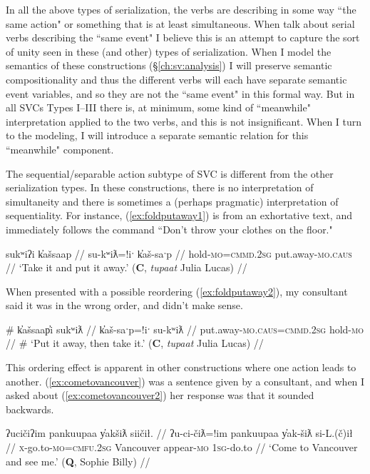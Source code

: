 In all the above types of serialization, the verbs are describing in some way ``the same action" or something that is at least simultaneous. When \citet{aikhenvalddixon2006} talk about serial verbs describing the ``same event" I believe this is an attempt to capture the sort of unity seen in these (and other) types of serialization. When I model the semantics of these constructions (\S\ref{ch:sv:analysis}) I will preserve semantic compositionality and thus the different verbs will each have separate semantic event variables, and so they are not the ``same event" in this formal way. But in all SVCs Types I--III there is, at minimum, some kind of ``meanwhile" interpretation applied to the two verbs, and this is not insignificant. When I turn to the modeling, I will introduce a separate semantic relation for this ``meanwhile" component.

The sequential/separable action subtype of SVC is different from the other serialization types. In these constructions, there is no interpretation of simultaneity and there is sometimes a (perhaps pragmatic) interpretation of sequentiality. For instance, (\ref{ex:foldputaway1}) is from an exhortative text, and immediately follows the command ``Don't throw your clothes on the floor."

\ex \label{ex:foldputaway1}
\begingl
\glpreamble sukʷiʔi k̓ašsaap //
\gla su-kʷiƛ=!iˑ k̓aš-saˑp //
\glb hold-\textsc{mo}=\textsc{cmmd.2sg} put.away-\textsc{mo.caus} //
\glft `Take it and put it away.' (\textbf{C}, \textit{tupaat} Julia Lucas) //
\endgl
\xe

When presented with a possible reordering (\ref{ex:foldputaway2}), my consultant said it was in the wrong order, and didn't make sense.

\ex \label{ex:foldputaway2}
\begingl
\glpreamble \# k̓ašsaap̓i sukʷiƛ //
\gla k̓aš-saˑp=!iˑ su-kʷiƛ //
\glb put.away-\textsc{mo.caus}=\textsc{cmmd.2sg} hold-\textsc{mo} //
\glft \# `Put it away, then take it.' (\textbf{C}, \textit{tupaat} Julia Lucas) //
\endgl
\xe

This ordering effect is apparent in other constructions where one action leads to another. (\ref{ex:cometovancouver}) was a sentence given by a consultant, and when I asked about (\ref{ex:cometovancouver2}) her response was that it sounded backwards.

\ex \label{ex:cometovancouver}
\begingl
\glpreamble ʔucičiʔim pankuupaa y̓akšiƛ siičił. //
\gla ʔu-ci-čiƛ=!im pankuupaa y̓ak-šiƛ si-L.(č)ił //
\glb \textsc{x}-go.to-\textsc{mo}=\textsc{cmfu.2sg} Vancouver appear-\textsc{mo} \textsc{1sg}-do.to //
\glft `Come to Vancouver and see me.' (\textbf{Q}, Sophie Billy) //
\endgl
\xe

